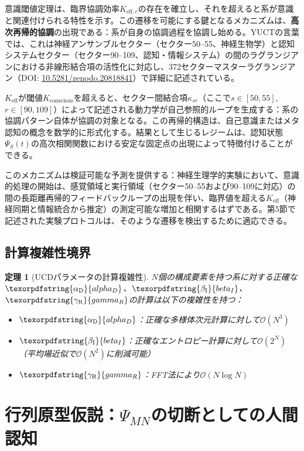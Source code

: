 \documentclass[11pt,a4paper]{article}
\newtheorem{theorem}{定理}
\DeclareRobustCommand{\alD}{\texorpdfstring{\ensuremath{\alpha_{\mathrm{D}}}}{alpha_D}}
\DeclareRobustCommand{\beI}{\texorpdfstring{\ensuremath{\beta_{\mathrm{I}}}}{beta_I}}
\DeclareRobustCommand{\gaR}{\texorpdfstring{\ensuremath{\gamma_{\mathrm{R}}}}{gamma_R}}
\newcommand{\eff}{\mathrm{eff}}
\begin{document}
	意識閾値定理は、臨界協調効率\(K_{\eff,c}\)の存在を確立し、それを超えると系が意識と関連付けられる特性を示す。この遷移を可能にする鍵となるメカニズムは、\textbf{高次再帰的協調}の出現である：系が自身の協調過程を協調し始める。YUCTの言葉では、これは神経アンサンブルセクター（セクター50--55、神経生物学）と認知システムセクター（セクター90--109、認知・情報システム）の間のラグランジアンにおける非線形結合項の活性化に対応し、372セクターマスターラグランジアン（DOI: \href{https://doi.org/10.5281/zenodo.20818841}{10.5281/zenodo.20818841}）で詳細に記述されている。
	
	\(K_{\eff}\)が閾値\(K_{\mathrm{conscious}}\)を超えると、セクター間結合項\(\kappa_{sr}\)（ここで\(s\in[50,55]\), \(r\in[90,109]\)）によって記述される動力学が自己参照的ループを生成する：系の協調パターン自体が協調の対象となる。この再帰的構造は、自己意識またはメタ認知の概念を数学的に形式化する。結果として生じるレジームは、認知状態\(\Psi_S(t)\)の高次相関関数における安定な固定点の出現によって特徴付けることができる。
	
	このメカニズムは検証可能な予測を提供する：神経生理学的実験において、意識的処理の開始は、感覚領域と実行領域（セクター50--55および90--109に対応）の間の長距離再帰的フィードバックループの出現を伴い、臨界値を超える\(K_{\eff}\)（神経同期と情報統合から推定）の測定可能な増加と相関するはずである。第5節で記述された実験プロトコルは、そのような遷移を検出するために適応できる。
	
	\subsection{計算複雑性境界}
	
	\begin{theorem}[UCDパラメータの計算複雑性]
		\(N\)個の構成要素を持つ系に対する正確な\(\alD\)、\(\beI\)、\(\gaR\)の計算は以下の複雑性を持つ：
		\begin{itemize}
			\item \(\alD\)：正確な多様体次元計算に対して\(\mathcal{O}(N^3)\)
			\item \(\beI\)：正確なエントロピー計算に対して\(\mathcal{O}(2^N)\)（平均場近似で\(\mathcal{O}(N^2)\)に削減可能）
			\item \(\gaR\)：FFT法により\(\mathcal{O}(N \log N)\)
		\end{itemize}
	\end{theorem}
	
	\section{行列原型仮説：\(\Psi_{MN}\)の切断としての人間認知}
	\label{sec:matrix}
	
\end{document}
